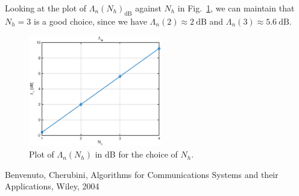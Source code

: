 \documentclass[10pt]{article}
\newcommand{\dB} {\mathrm{dB}}
\numberwithin{equation}{section}
\begin{document}
Looking at the plot of $\Lambda_n (N_h)_{\dB}$ against $N_h$ in Fig.~\ref{fig:p01_lambda_n}, we can maintain that $N_h = 3$ is a good choice, since we have $\Lambda_n(2) \approx 2~\dB$ and $\Lambda_n(3) \approx 5.6~\dB$.

\begin{figure}[ht]
	\centering
	\includegraphics[width=0.52\textwidth]{p01_lambda_n}
	\caption{Plot of $\Lambda_n (N_h)$ in dB for the choice of $N_h$.}
    \label{fig:p01_lambda_n}
\end{figure}

\begin{thebibliography}{10}

Benvenuto, Cherubini, Algorithms for Communications Systems and their Applications, Wiley, 2004


\end{thebibliography}
\end{document}
